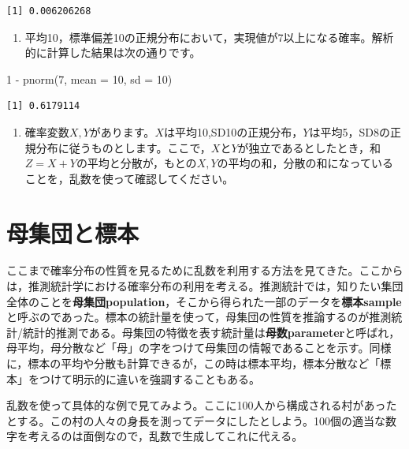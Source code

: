 \documentclass[
  a4paper,
]{ltjsbook}
\newenvironment{Shaded}{\begin{snugshade}}{\end{snugshade}}
\newcommand{\AttributeTok}[1]{\textcolor[rgb]{0.40,0.45,0.13}{#1}}
\newcommand{\DecValTok}[1]{\textcolor[rgb]{0.68,0.00,0.00}{#1}}
\newcommand{\FunctionTok}[1]{\textcolor[rgb]{0.28,0.35,0.67}{#1}}
\newcommand{\NormalTok}[1]{\textcolor[rgb]{0.00,0.23,0.31}{#1}}
\newcommand{\SpecialCharTok}[1]{\textcolor[rgb]{0.37,0.37,0.37}{#1}}
\providecommand{\tightlist}{%
  \setlength{\itemsep}{0pt}\setlength{\parskip}{0pt}}
\begin{document}
\begin{verbatim}
[1] 0.006206268
\end{verbatim}

\begin{enumerate}
\def\labelenumi{\arabic{enumi}.}
\setcounter{enumi}{3}
\tightlist
\item
  平均10，標準偏差10の正規分布において，実現値が7以上になる確率。解析的に計算した結果は次の通りです。
\end{enumerate}

\begin{Shaded}
\begin{Highlighting}[]
\DecValTok{1} \SpecialCharTok{{-}} \FunctionTok{pnorm}\NormalTok{(}\DecValTok{7}\NormalTok{, }\AttributeTok{mean =} \DecValTok{10}\NormalTok{, }\AttributeTok{sd =} \DecValTok{10}\NormalTok{)}
\end{Highlighting}
\end{Shaded}

\begin{verbatim}
[1] 0.6179114
\end{verbatim}

\begin{enumerate}
\def\labelenumi{\arabic{enumi}.}
\setcounter{enumi}{4}
\tightlist
\item
  確率変数\(X,Y\)があります。\(X\)は平均10,SD10の正規分布，\(Y\)は平均5，SD8の正規分布に従うものとします。ここで，\(X\)と\(Y\)が独立であるとしたとき，和\(Z=X+Y\)の平均と分散が，もとの\(X,Y\)の平均の和，分散の和になっていることを，乱数を使って確認してください。
\end{enumerate}

\section{母集団と標本}\label{ux6bcdux96c6ux56e3ux3068ux6a19ux672c}

ここまで確率分布の性質を見るために乱数を利用する方法を見てきた。ここからは，推測統計学における確率分布の利用を考える。推測統計では，知りたい集団全体のことを\textbf{母集団population}，そこから得られた一部のデータを\textbf{標本sample}と呼ぶのであった。標本の統計量を使って，母集団の性質を推論するのが推測統計/統計的推測である。母集団の特徴を表す統計量は\textbf{母数parameter}と呼ばれ，母平均，母分散など「母」の字をつけて母集団の情報であることを示す。同様に，標本の平均や分散も計算できるが，この時は標本平均，標本分散など「標本」をつけて明示的に違いを強調することもある。

乱数を使って具体的な例で見てみよう。ここに100人から構成される村があったとする。この村の人々の身長を測ってデータにしたとしよう。100個の適当な数字を考えるのは面倒なので，乱数で生成してこれに代える。
\end{document}
